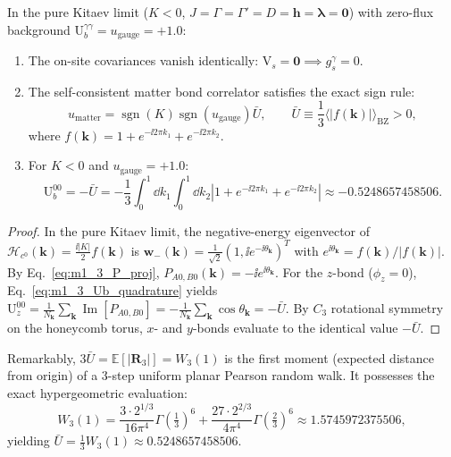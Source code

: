 \begin{theorem}
\label{thm:m1_3_k006_sign_structure}
In the pure Kitaev limit ($K < 0$, $J = \Gamma = \Gamma' = D = \mathbf{h} = \boldsymbol{\lambda} = \mathbf{0}$) with zero-flux background $\mathrm{U}_b^{\gamma\gamma} = u_{\mathrm{gauge}} = +1.0$:
\begin{enumerate}
\item The on-site covariances vanish identically: $\mathrm{V}_s = \mathbf{0} \implies g_s^\gamma = 0$.
\item The self-consistent matter bond correlator satisfies the exact sign rule:
\begin{equation}
\label{eq:m1_3_matter_sign_rule}
u_{\mathrm{matter}} = \operatorname{sgn}(K) \operatorname{sgn}(u_{\mathrm{gauge}}) \bar{U}, \qquad \bar{U} \equiv \frac{1}{3} \langle |f(\mathbf{k})| \rangle_{\mathrm{BZ}} > 0,
\end{equation}
where $f(\mathbf{k}) = 1 + e^{-\ii 2\pi k_1} + e^{-\ii 2\pi k_2}$.
\item For $K < 0$ and $u_{\mathrm{gauge}} = +1.0$:
\begin{equation}
\label{eq:m1_3_U_bar_integral}
\mathrm{U}_b^{00} = -\bar{U} = -\frac{1}{3} \int_0^1 \dd k_1 \int_0^1 \dd k_2 |1 + e^{-\ii 2\pi k_1} + e^{-\ii 2\pi k_2}| \approx -0.5248657458506.
\end{equation}
\end{enumerate}
\end{theorem}
\begin{proof}
In the pure Kitaev limit, the negative-energy eigenvector of $\mathcal{H}_{c^0}(\mathbf{k}) = \frac{\ii|K|}{2} f(\mathbf{k})$ is $\mathbf{w}_-(\mathbf{k}) = \frac{1}{\sqrt{2}}(1, \ii e^{-\ii \theta_{\mathbf{k}}})^T$ with $e^{\ii \theta_{\mathbf{k}}} = f(\mathbf{k})/|f(\mathbf{k})|$. By Eq.~\eqref{eq:m1_3_P_proj}, $P_{A0, B0}(\mathbf{k}) = -\ii e^{\ii \theta_{\mathbf{k}}}$. For the $z$-bond ($\phi_z = 0$), Eq.~\eqref{eq:m1_3_Ub_quadrature} yields $\mathrm{U}_z^{00} = \frac{1}{N_{\mathbf{k}}} \sum_{\mathbf{k}} \operatorname{Im}[P_{A0, B0}] = -\frac{1}{N_{\mathbf{k}}} \sum_{\mathbf{k}} \cos\theta_{\mathbf{k}} = -\bar{U}$. By $C_3$ rotational symmetry on the honeycomb torus, $x$- and $y$-bonds evaluate to the identical value $-\bar{U}$.
\end{proof}

Remarkably, $3\bar{U} = \mathbb{E}[|\mathbf{R}_3|] = W_3(1)$ is the first moment (expected distance from origin) of a 3-step uniform planar Pearson random walk. It possesses the exact hypergeometric evaluation:
\begin{equation}
\label{eq:m1_3_pearson_hypergeometric}
W_3(1) = \frac{3 \cdot 2^{1/3}}{16\pi^4} \Gamma\left(\tfrac{1}{3}\right)^6 + \frac{27 \cdot 2^{2/3}}{4\pi^4} \Gamma\left(\tfrac{2}{3}\right)^6 \approx 1.5745972375506,
\end{equation}
yielding $\bar{U} = \frac{1}{3} W_3(1) \approx 0.5248657458506$.

